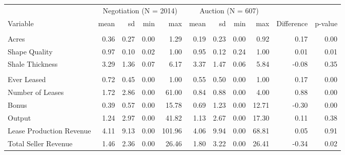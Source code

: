 
\begin{tabular}{lrrrrrrrrrr}
\toprule
\multicolumn{1}{c}{ } & \multicolumn{4}{c}{Negotiation (N = 2014)} & \multicolumn{4}{c}{Auction (N = 607)} \\
\cmidrule(l{3pt}r{3pt}){2-5} \cmidrule(l{3pt}r{3pt}){6-9}
Variable & mean & sd & min & max & mean & sd & min & max & Difference & p-value\\
\midrule
\addlinespace[0.3em]
\multicolumn{11}{l}{\textbf{Land Characteristics}}\\
\hspace{1em}Acres & 0.36 & 0.27 & 0.00 & 1.29 & 0.19 & 0.23 & 0.00 & 0.92 & 0.17 & 0.00\\
\hspace{1em}Shape Quality & 0.97 & 0.10 & 0.02 & 1.00 & 0.95 & 0.12 & 0.24 & 1.00 & 0.01 & 0.01\\
\hspace{1em}Shale Thickness & 3.29 & 1.36 & 0.07 & 6.17 & 3.37 & 1.47 & 0.06 & 5.84 & -0.08 & 0.35\\
\addlinespace[0.3em]
\multicolumn{11}{l}{\textbf{Parcel Outcomes}}\\
\hspace{1em}Ever Leased & 0.72 & 0.45 & 0.00 & 1.00 & 0.55 & 0.50 & 0.00 & 1.00 & 0.17 & 0.00\\
\hspace{1em}Number of Leases & 1.72 & 2.86 & 0.00 & 61.00 & 0.84 & 0.88 & 0.00 & 4.00 & 0.88 & 0.00\\
\hspace{1em}Bonus & 0.39 & 0.57 & 0.00 & 15.78 & 0.69 & 1.23 & 0.00 & 12.71 & -0.30 & 0.00\\
\hspace{1em}Output & 1.24 & 2.97 & 0.00 & 41.82 & 1.13 & 2.67 & 0.00 & 17.30 & 0.11 & 0.38\\
\hspace{1em}Lease Production Revenue & 4.11 & 9.13 & 0.00 & 101.96 & 4.06 & 9.94 & 0.00 & 68.81 & 0.05 & 0.91\\
\hspace{1em}Total Seller Revenue & 1.46 & 2.36 & 0.00 & 26.46 & 1.80 & 3.22 & 0.00 & 26.41 & -0.34 & 0.02\\
\bottomrule
\end{tabular}
